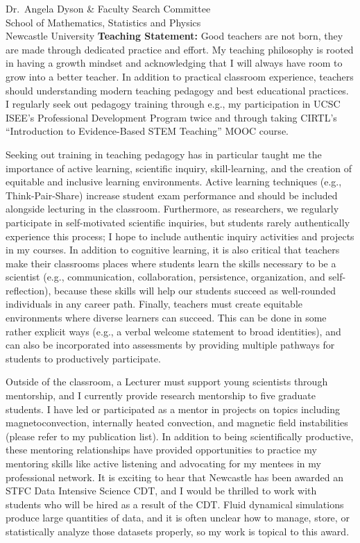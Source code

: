 \documentclass[12pt, a4paper]{letter}
\begin{document}
\begin{letter}{
        Dr.~Angela Dyson \& Faculty Search Committee \\
        School of Mathematics, Statistics and Physics \\
        Newcastle University}
    \textbf{Teaching Statement:} Good teachers are not born, they are made through dedicated practice and effort.
    My teaching philosophy is rooted in having a growth mindset and acknowledging that I will always have room to grow into a better teacher.
    In addition to practical classroom experience, teachers should understanding modern teaching pedagogy and best educational practices.
    I regularly seek out pedagogy training through e.g., my participation in UCSC ISEE's Professional Development Program twice and through taking CIRTL's ``Introduction to Evidence-Based STEM Teaching'' MOOC course. 
    
    Seeking out training in teaching pedagogy has in particular taught me the importance of active learning, scientific inquiry, skill-learning, and the creation of equitable and inclusive learning environments.
    Active learning techniques (e.g., Think-Pair-Share) increase student exam performance and should be included alongside lecturing in the classroom.
    Furthermore, as researchers, we regularly participate in self-motivated scientific inquiries, but students rarely authentically experience this process; I hope to include authentic inquiry activities and projects in my courses.
    In addition to cognitive learning, it is also critical that teachers make their classrooms places where students learn the skills necessary to be a scientist (e.g., communication, collaboration, persistence, organization, and self-reflection), because these skills will help our students succeed as well-rounded individuals in any career path.
    Finally, teachers must create equitable environments where diverse learners can succeed.
    This can be done in some rather explicit ways (e.g., a verbal welcome statement to broad identities), and can also be incorporated into assessments by providing multiple pathways for students to productively participate.

    Outside of the classroom, a Lecturer must support young scientists through mentorship, and I currently provide research mentorship to five graduate students.
    I have led or participated as a mentor in projects on topics including  magnetoconvection, internally heated convection, and magnetic field instabilities (please refer to my publication list).
    In addition to being scientifically productive, these mentoring relationships have provided opportunities to practice my mentoring skills like active listening and advocating for my mentees in my professional network.
    It is exciting to hear that Newcastle has been awarded an STFC Data Intensive Science CDT, and I would be thrilled to work with students who will be hired as a result of the CDT.
    Fluid dynamical simulations produce large quantities of data, and it is often unclear how to manage, store, or statistically analyze those datasets properly, so my work is topical to this award.


\end{letter}
\end{document}
